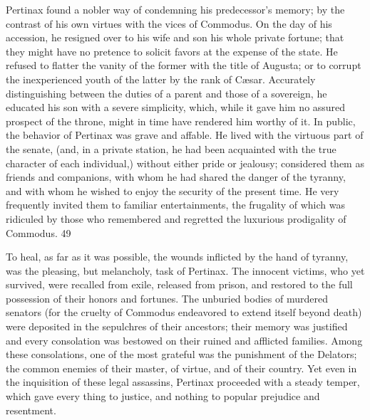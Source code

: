 

Pertinax found a nobler way of condemning his predecessor’s
memory; by the contrast of his own virtues with the vices of
Commodus. On the day of his accession, he resigned over to his
wife and son his whole private fortune; that they might have no
pretence to solicit favors at the expense of the state. He
refused to flatter the vanity of the former with the title of
Augusta; or to corrupt the inexperienced youth of the latter by
the rank of Cæsar. Accurately distinguishing between the duties
of a parent and those of a sovereign, he educated his son with a
severe simplicity, which, while it gave him no assured prospect
of the throne, might in time have rendered him worthy of it. In
public, the behavior of Pertinax was grave and affable. He lived
with the virtuous part of the senate, (and, in a private station,
he had been acquainted with the true character of each
individual,) without either pride or jealousy; considered them as
friends and companions, with whom he had shared the danger of the
tyranny, and with whom he wished to enjoy the security of the
present time. He very frequently invited them to familiar
entertainments, the frugality of which was ridiculed by those who
remembered and regretted the luxurious prodigality of Commodus.
49


To heal, as far as it was possible, the wounds inflicted by the
hand of tyranny, was the pleasing, but melancholy, task of
Pertinax. The innocent victims, who yet survived, were recalled
from exile, released from prison, and restored to the full
possession of their honors and fortunes. The unburied bodies of
murdered senators (for the cruelty of Commodus endeavored to
extend itself beyond death) were deposited in the sepulchres of
their ancestors; their memory was justified and every consolation
was bestowed on their ruined and afflicted families. Among these
consolations, one of the most grateful was the punishment of the
Delators; the common enemies of their master, of virtue, and of
their country. Yet even in the inquisition of these legal
assassins, Pertinax proceeded with a steady temper, which gave
every thing to justice, and nothing to popular prejudice and
resentment.

